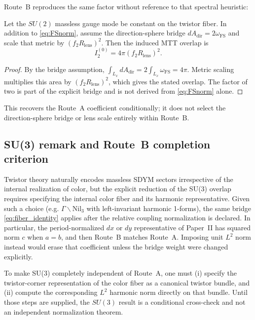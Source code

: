 \documentclass[11pt]{article}
\begin{document}
Route~B reproduces the same factor without reference to that spectral heuristic:

\begin{proposition}[Conditional recovery of $\kappa_\ell=4\pi$]
Let the $SU(2)$ massless gauge mode be constant on the twistor fiber. In
addition to \eqref{eq:FSnorm}, assume the direction-sphere bridge
$dA_{\mathrm{dir}}=2\omega_{\mathrm{FS}}$ and scale that metric by
$(f_2R_{\mathrm{lens}})^2$. Then the induced MTT overlap is
\[
I_2^{(0)} = 4\pi(f_2R_{\mathrm{lens}})^2.
\]
\end{proposition}

\begin{proof}
By the bridge assumption,
$\int_{L_x}dA_{\mathrm{dir}}=2\int_{L_x}\omega_{\mathrm{FS}}=4\pi$.
Metric scaling multiplies this area by $(f_2R_{\mathrm{lens}})^2$,
which gives the stated overlap. The factor of two is part of the explicit
bridge and is not derived from \eqref{eq:FSnorm} alone.
\end{proof}

This recovers the Route~A coefficient conditionally; it does not select the
direction-sphere bridge or lens scale entirely within Route~B.

\subsection{SU(3) remark and Route~B completion criterion}

Twistor theory naturally encodes massless SDYM sectors irrespective of the internal
realization of color, but the explicit reduction of the SU(3) overlap requires specifying
the internal color fiber and its harmonic representative.
Given such a choice (e.g. $\Gamma\backslash\mathrm{Nil}_3$ with left-invariant harmonic 1-forms),
the same bridge \eqref{eq:fiber_identity} applies after the relative
coupling normalization is declared. In particular, the period-normalized
$dx$ or $dy$ representative of Paper~II has squared norm $c$ when $a=b$,
and then Route~B matches Route~A. Imposing unit $L^2$ norm instead would
erase that coefficient unless the bridge weight were changed explicitly.

\begin{remark}
To make SU(3) completely independent of Route~A, one must (i) specify the twistor-corner
representation of the color fiber as a canonical twistor bundle, and (ii) compute the
corresponding $L^2$ harmonic norm directly on that bundle. Until those steps are supplied, the $SU(3)$ result is a conditional
cross-check and not an independent normalization theorem.
\end{remark}
\end{document}
